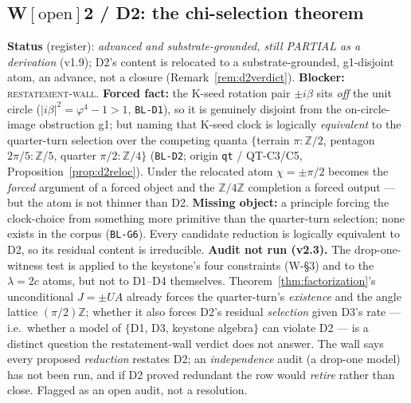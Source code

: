 \documentclass[11pt]{article}
\newcommand{\hx}[1]{\textcolor{cC}{\footnotesize\texttt{#1}}}
\newcommand{\Z}{\mathbb{Z}}
\newcommand{\gp}{\varphi}
\theoremstyle{plain}
\theoremstyle{definition}
\theoremstyle{remark}
\begin{document}
\subsection{W\texorpdfstring{$[\text{open}]$}{[open]}2 / D2: the chi-selection theorem}\label{blk:d2}
\textbf{Status} (register): \emph{advanced and substrate-grounded, still
PARTIAL as a derivation} (v1.9); D2's content is relocated to a
substrate-grounded, g1-disjoint atom, an advance, not a closure
(Remark~\ref{rem:d2verdict}). \textbf{Blocker:} \textsc{restatement-wall}.
\textbf{Forced fact:} the K-seed rotation pair $\pm i\beta$ sits \emph{off} the
unit circle ($|i\beta|^2=\gp^4-1>1$, \hx{BL-D1}), so it is genuinely disjoint
from the on-circle-image obstruction g1; but naming that K-seed clock is
logically \emph{equivalent} to the quarter-turn selection over the competing
quanta $\{$terrain $\pi:\Z/2$, pentagon $2\pi/5:\Z/5$, quarter $\pi/2:\Z/4\}$
(\hx{BL-D2}; origin \texttt{qt} / QT-C3/C5, Proposition~\ref{prop:d2reloc}).
Under the relocated atom $\chi=\pm\pi/2$ becomes the \emph{forced} argument of a
forced object and the $\Z/4\Z$ completion a forced output --- but the atom is not
thinner than D2. \textbf{Missing object:} a principle forcing the clock-choice
from something more primitive than the quarter-turn selection; none exists in the
corpus (\hx{BL-G6}). Every candidate reduction is logically equivalent to D2, so
its residual content is irreducible.
\textbf{Audit not run (v2.3).} The drop-one-witness test is applied to the
keystone's four constraints (W-\S3) and to the $\lambda=2c$ atoms, but not to
D1--D4 themselves. Theorem~\ref{thm:factorization}'s unconditional $J=\pm UA$
already forces the quarter-turn's \emph{existence} and the angle lattice
$(\pi/2)\Z$; whether it also forces D2's residual \emph{selection} given D3's rate
--- i.e.\ whether a model of $\{$D1, D3, keystone algebra$\}$ can violate D2 ---
is a distinct question the restatement-wall verdict does not answer. The wall says
every proposed \emph{reduction} restates D2; an \emph{independence} audit (a
drop-one model) has not been run, and if D2 proved redundant the row would
\emph{retire} rather than close. Flagged as an open audit, not a resolution.
\end{document}
